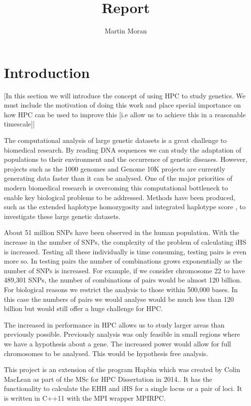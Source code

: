 \documentclass[a4paper,12pt]{report}
\begin{document}
\title{Report}
\author{Martin Moran}
\maketitle

\chapter{Introduction}
[In this section we will introduce the concept of using HPC to study genetics. We must include the motivation of doing this work and place special importance on how HPC can be used to improve this [i.e allow us to achieve this in a reasonable timescale]]

The computational analysis of large genetic datasets is a great challenge to biomedical research. By reading DNA sequences we can study the adaptation of populations to their environment and the occurrence of genetic diseases. However, projects such as the 1000 genomes \cite{1000} and Genome 10K \cite{10K} projects are currently generating data faster than it can be analysed. One of the major priorities of modern biomedical research is overcoming this computational bottleneck to enable key biological problems to be addressed. Methods have been produced, such as the extended haplotype homozygosity \cite{EHH} and integrated haplotype score \cite{iHS}, to investigate these large genetic datasets. 

About 51 million SNPs have been observed in the human population. With the increase in the number of SNPs, the complexity of the problem of calculating iHS is increased. Testing all these individually is time consuming, testing pairs is even more so. In testing pairs the number of combinations grows exponentially as the number of SNPs is increased. For example, if we consider chromosome 22 to have 489,301 SNPs, the number of combinations of pairs would be almost 120 billion. For biological reasons we restrict the analysis to those within 500,000 bases. In this case the numbers of pairs we would analyse would be much less than 120 billion but would still offer a huge challenge for HPC.

The increased in performance in HPC allows us to study larger areas than previously possible. Previously analysis was only feasible in small regions where we have a hypothesis about a gene. The increased power would allow for full chromosomes to be analysed. This would be hypothesis free analysis.

This project is an extension of the program Hapbin which was created by Colin MacLean as part of the MSc for HPC Dissertation in 2014.\cite{hapbin}. It has the functionality to calculate the EHH and iHS for a single locus or a pair of loci. It is written in C++11 with the MPI wrapper MPIRPC.
\end{document}
